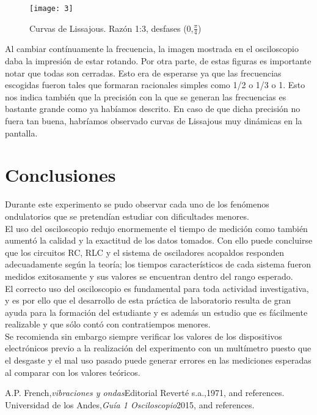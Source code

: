 \documentclass[%
 reprint,
 amsmath,amssymb,
 aps,
]{revtex4-1}
\begin{document}
\begin{figure}[h!]
\caption{ Curvas de Lissajous. Razón 1:3, desfases (0,$\frac{\pi}{4}$) }
\centering
\texttt{[image: 3]}
\label{fig:amortiguado}
\end{figure}

Al cambiar contínuamente la frecuencia, la imagen mostrada en el osciloscopio daba la impresión de estar rotando. Por otra parte, de estas figuras es importante notar que todas son cerradas. Esto era de esperarse ya que las frecuencias escogidas fueron tales que formaran racionales simples como 1/2 o 1/3 o 1. Esto nos indica también que la precisión con la que se generan las frecuencias es bastante grande como ya habíamos descrito. En caso de que dicha precisión no fuera tan buena, habríamos observado curvas de Lissajous muy dinámicas en la pantalla.\\


\section{\label{sec:level1}Conclusiones}
 Durante este experimento se pudo observar cada uno de los fen\'omenos ondulatorios que se pretend\'ian estudiar con dificultades menores. \\

El uso del osciloscopio redujo enormemente el tiempo de medici\'on como tambi\'en aument\'o la calidad y la exactitud de los datos tomados. Con ello puede concluirse que los circuitos RC, RLC y el sistema de osciladores acopaldos responden adecuadamente seg\'un la teor\'ia; los tiempos caracter\'isticos de cada sistema fueron medidos exitosamente y sus valores se encuentran dentro del rango esperado.\\ 

El correcto uso del osciloscopio es fundamental para toda actividad investigativa, y es por ello que el desarrollo de esta pr\'actica de laboratorio resulta de gran ayuda para la formaci\'on del estudiante y es adem\'as un estudio que es f\'acilmente realizable y que s\'olo cont\'o con contratiempos menores.\\ 

Se recomienda sin embargo siempre verificar los valores de los dispositivos electr\'onicos previo a la realizaci\'on del experimento con un mult\'imetro puesto que el desgaste y el mal uso pasado puede generar errores en las mediciones esperadas al comparar con los valores te\'oricos.\\



\begin{thebibliography}{99} 
 A.P. French,{\it vibraciones y ondas}{Editorial Reverté s.a.,1971}, and references.\\ 
 Universidad de los Andes,{\it Guía 1 Osciloscopio}{2015}, and references.\\ \end{thebibliography}
\end{document}
